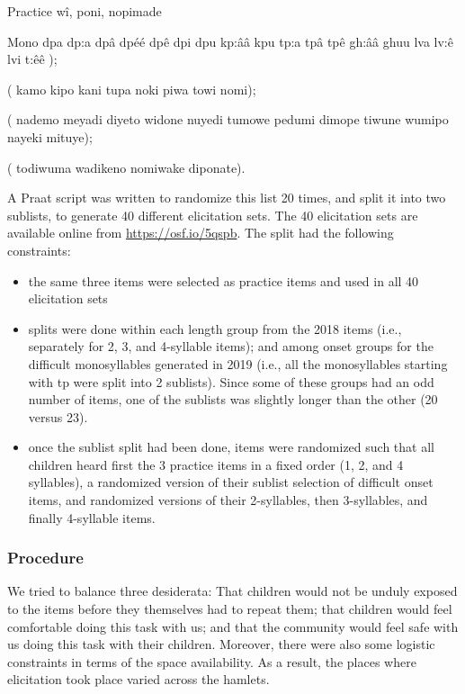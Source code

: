\documentclass[english,,man]{apa6}
\providecommand{\tightlist}{%
  \setlength{\itemsep}{0pt}\setlength{\parskip}{0pt}}
\begin{document}
Practice
wî, poni, nopimade

Mono
dpa
dp:a
dpâ
dpéé
dpê
dpi
dpu
kp:ââ
kpu
tp:a
tpâ
tpê
gh:ââ
ghuu
lva
lv:ê
lvi
t:êê
);

(
kamo
kipo
kani
tupa
noki
piwa
towi
nomi);

(
nademo
meyadi
diyeto
widone
nuyedi
tumowe
pedumi
dimope
tiwune
wumipo
nayeki
mituye);

(
todiwuma
wadikeno
nomiwake
diponate).

A Praat script was written to randomize this list 20 times, and split it into two sublists, to generate 40 different elicitation sets. The 40 elicitation sets are available online from \url{https://osf.io/5qspb}. The split had the following constraints:

\begin{itemize}
\tightlist
\item
  the same three items were selected as practice items and used in all 40 elicitation sets
\item
  splits were done within each length group from the 2018 items (i.e., separately for 2, 3, and 4-syllable items); and among onset groups for the difficult monosyllables generated in 2019 (i.e., all the monosyllables starting with tp were split into 2 sublists). Since some of these groups had an odd number of items, one of the sublists was slightly longer than the other (20 versus 23).
\item
  once the sublist split had been done, items were randomized such that all children heard first the 3 practice items in a fixed order (1, 2, and 4 syllables), a randomized version of their sublist selection of difficult onset items, and randomized versions of their 2-syllables, then 3-syllables, and finally 4-syllable items.
\end{itemize}

\hypertarget{procedure}{%
\subsubsection{Procedure}\label{procedure}}

We tried to balance three desiderata: That children would not be unduly exposed to the items before they themselves had to repeat them; that children would feel comfortable doing this task with us; and that the community would feel safe with us doing this task with their children. Moreover, there were also some logistic constraints in terms of the space availability. As a result, the places where elicitation took place varied across the hamlets.
\end{document}
